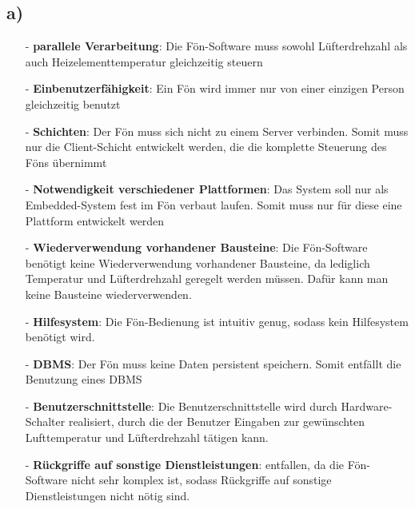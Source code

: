 \subsection*{a)}
\begin{itemize}
\item[-] \textbf{parallele Verarbeitung}: Die Fön-Software muss sowohl Lüfterdrehzahl als auch Heizelementtemperatur gleichzeitig steuern\\
\item[-] \textbf{Einbenutzerfähigkeit}: Ein Fön wird immer nur von einer einzigen Person gleichzeitig benutzt\\
\item[-] \textbf{Schichten}: Der Fön muss sich nicht zu einem Server verbinden. Somit muss nur die Client-Schicht entwickelt werden, die die komplette Steuerung des Föns übernimmt\\
\item[-] \textbf{Notwendigkeit verschiedener Plattformen}: Das System soll nur als Embedded-System fest im Fön verbaut laufen. Somit muss nur für diese eine Plattform entwickelt werden
\item[-] \textbf{Wiederverwendung vorhandener Bausteine}: Die Fön-Software benötigt keine Wiederverwendung vorhandener Bausteine, da lediglich Temperatur und Lüfterdrehzahl geregelt werden müssen. Dafür kann man keine Bausteine wiederverwenden.\\
\item[-] \textbf{Hilfesystem}: Die Fön-Bedienung ist intuitiv genug, sodass kein Hilfesystem benötigt wird.
\item[-] \textbf{DBMS}: Der Fön muss keine Daten persistent speichern. Somit entfällt die Benutzung eines DBMS\\
\item[-] \textbf{Benutzerschnittstelle}: Die Benutzerschnittstelle wird durch Hardware-Schalter realisiert, durch die der Benutzer Eingaben zur gewünschten Lufttemperatur und Lüfterdrehzahl tätigen kann.\\
\item[-] \textbf{Rückgriffe auf sonstige Dienstleistungen}: entfallen, da die Fön-Software nicht sehr komplex ist, sodass Rückgriffe auf sonstige Dienstleistungen nicht nötig sind.\\
\end{itemize}
\newpage
